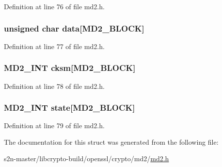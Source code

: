 Definition at line 76 of file md2.\+h.

\subsubsection[{\texorpdfstring{data}{data}}]{\setlength{\rightskip}{0pt plus 5cm}unsigned char data\mbox{[}{\bf M\+D2\+\_\+\+B\+L\+O\+CK}\mbox{]}}\hypertarget{struct_m_d2state__st_a4e422b85a4c1ea165636ac71310124f2}{}\label{struct_m_d2state__st_a4e422b85a4c1ea165636ac71310124f2}


Definition at line 77 of file md2.\+h.

\subsubsection[{\texorpdfstring{cksm}{cksm}}]{\setlength{\rightskip}{0pt plus 5cm}M\+D2\+\_\+\+I\+NT cksm\mbox{[}{\bf M\+D2\+\_\+\+B\+L\+O\+CK}\mbox{]}}\hypertarget{struct_m_d2state__st_a3b49a88707503eeccdcce6da10e8453c}{}\label{struct_m_d2state__st_a3b49a88707503eeccdcce6da10e8453c}


Definition at line 78 of file md2.\+h.

\subsubsection[{\texorpdfstring{state}{state}}]{\setlength{\rightskip}{0pt plus 5cm}M\+D2\+\_\+\+I\+NT state\mbox{[}{\bf M\+D2\+\_\+\+B\+L\+O\+CK}\mbox{]}}\hypertarget{struct_m_d2state__st_ae94c41ba5086214cb008bd259b474985}{}\label{struct_m_d2state__st_ae94c41ba5086214cb008bd259b474985}


Definition at line 79 of file md2.\+h.



The documentation for this struct was generated from the following file\+:\begin{DoxyCompactItemize}
\item 
s2n-\/master/libcrypto-\/build/openssl/crypto/md2/\hyperlink{md2_8h}{md2.\+h}\end{DoxyCompactItemize}
